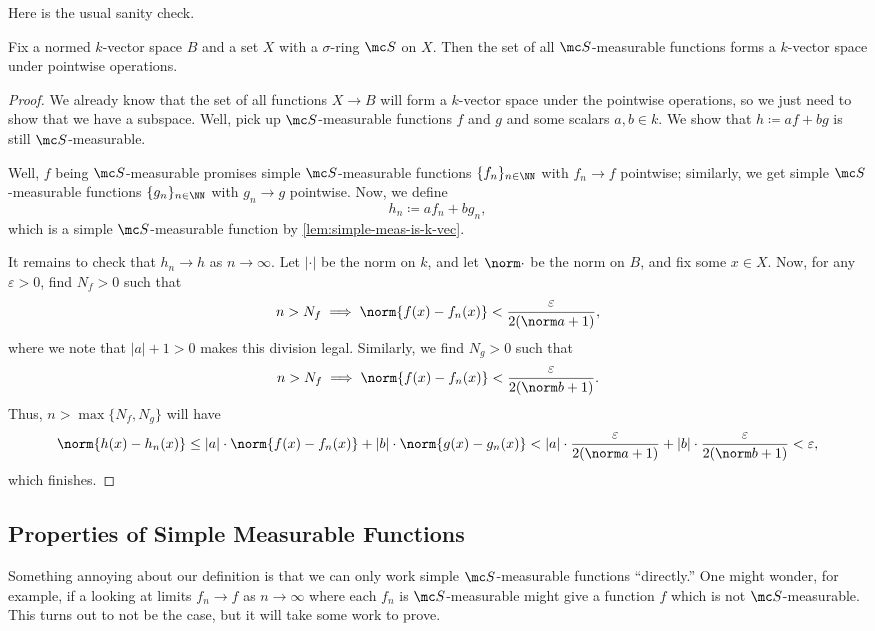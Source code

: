 \documentclass[../notes.tex]{subfiles}
\begin{document}
Here is the usual sanity check.
\begin{lemma} \label{lem:meas-is-vec-space}
	Fix a normed $k$-vector space $B$ and a set $X$ with a $\sigma$-ring $\mc S$ on $X$. Then the set of all $\mc S$-measurable functions forms a $k$-vector space under pointwise operations.
\end{lemma}
\begin{proof}
	We already know that the set of all functions $X\to B$ will form a $k$-vector space under the pointwise operations, so we just need to show that we have a subspace. Well, pick up $\mc S$-measurable functions $f$ and $g$ and some scalars $a,b\in k$. We show that $h\coloneqq af+bg$ is still $\mc S$-measurable.

	Well, $f$ being $\mc S$-measurable promises simple $\mc S$-measurable functions $\{f_n\}_{n\in\NN}$ with $f_n\to f$ pointwise; similarly, we get simple $\mc S$-measurable functions $\{g_n\}_{n\in\NN}$ with $g_n\to g$ pointwise. Now, we define
	\[h_n\coloneqq af_n+bg_n,\]
	which is a simple $\mc S$-measurable function by \autoref{lem:simple-meas-is-k-vec}.

	It remains to check that $h_n\to h$ as $n\to\infty$. Let $|\cdot|$ be the norm on $k$, and let $\norm\cdot$ be the norm on $B$, and fix some $x\in X$. Now, for any $\varepsilon>0$, find $N_f>0$ such that
	\[n>N_f\implies\norm{f(x)-f_n(x)}<\frac\varepsilon{2(\norm a+1)},\]
	where we note that $|a|+1>0$ makes this division legal. Similarly, we find $N_g>0$ such that
	\[n>N_f\implies\norm{f(x)-f_n(x)}<\frac\varepsilon{2(\norm b+1)}.\]
	Thus, $n>\max\{N_f,N_g\}$ will have
	\[\norm{h(x)-h_n(x)}\le |a|\cdot\norm{f(x)-f_n(x)}+|b|\cdot\norm{g(x)-g_n(x)}<|a|\cdot\frac\varepsilon{2(\norm a+1)}+|b|\cdot\frac\varepsilon{2(\norm b+1)}<\varepsilon,\]
	which finishes.
\end{proof}

\subsection{Properties of Simple Measurable Functions}
Something annoying about our definition is that we can only work simple $\mc S$-measurable functions ``directly.'' One might wonder, for example, if a looking at limits $f_n\to f$ as $n\to\infty$ where each $f_n$ is $\mc S$-measurable might give a function $f$ which is not $\mc S$-measurable. This turns out to not be the case, but it will take some work to prove.
\end{document}
